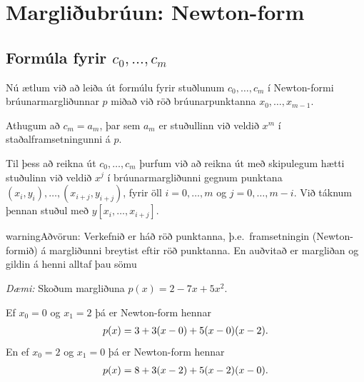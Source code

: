 \documentclass[letterpaper,10pt,icelandic]{sphinxmanual}
\begin{document}

\section{Margliðubrúun: Newton-form}
\label{kafli03:index-8}\label{kafli03:margliubruun-newton-form}

\subsection{Formúla fyrir \(c_0, \ldots, c_m\)}
\label{kafli03:formula-fyrir}
Nú ætlum við að leiða út formúlu fyrir stuðlunum
\(c_0, \ldots, c_m\) í Newton-formi brúunarmargliðunnar \(p\)
miðað við röð brúunarpunktanna \(x_0, \ldots, x_{m-1}\).

Athugum að \(c_m = a_m\), þar sem \(a_m\) er stuðullinn við
veldið \(x^m\) í staðalframsetningunni á \(p\).

Til þess að reikna út \(c_0, \ldots, c_m\) þurfum við að reikna út
með skipulegum hætti stuðulinn við veldið \(x^j\) í
brúunarmargliðunni gegnum punktana
\((x_i,y_i), \ldots, (x_{i+j},y_{i+j})\), fyrir öll
\(i = 0, \ldots, m\) og \(j = 0, \ldots, m-i\). Við táknum
þennan stuðul með \(y[x_i, \ldots, x_{i+j}]\).

\begin{notice}{warning}{Aðvörun:}
Verkefnið er háð röð punktanna, þ.e. framsetningin (Newton-formið) á
margliðunni breytist eftir röð punktanna.
En auðvitað er margliðan og gildin á henni alltaf þau sömu

\emph{Dæmi:} Skoðum margliðuna \(p(x) = 2-7x+5x^2\).

Ef \(x_0=0\) og \(x_1=2\) þá er Newton-form hennar
\begin{gather}
\begin{split}p(x) = 3 + 3(x-0) + 5(x-0)(x-2).\end{split}\notag
\end{gather}
En ef \(x_0=2\) og \(x_1=0\) þá er Newton-form hennar
\begin{gather}
\begin{split}p(x) = 8 + 3(x-2) + 5(x-2)(x-0).\end{split}\notag
\end{gather}\end{notice}

\end{document}
